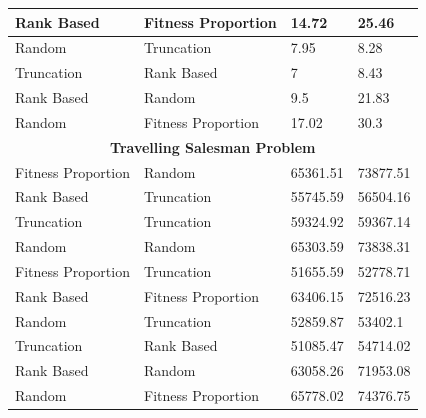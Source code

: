 \documentclass[11pt, letterpaper]{article}
\begin{document}
\begin{table}[ht]
\begin{tabular}{|l|l|l|l|}
        Rank Based & Fitness Proportion & 14.72 & 25.46 \\ \hline
        Random & Truncation & 7.95 & 8.28 \\ \hline
        Truncation & Rank Based & 7 & 8.43 \\ \hline
        Rank Based & Random & 9.5 & 21.83 \\ \hline
        Random & Fitness Proportion & 17.02 & 30.3 \\ \hline
        \multicolumn{4}{|c|}{\textbf{Travelling Salesman Problem}} \\ \hline
        Fitness Proportion & Random & 65361.51 & 73877.51 \\ \hline
        Rank Based & Truncation & 55745.59 & 56504.16 \\ \hline
        Truncation & Truncation & 59324.92 & 59367.14 \\ \hline
        Random & Random & 65303.59 & 73838.31 \\ \hline
        Fitness Proportion & Truncation & 51655.59 & 52778.71 \\ \hline
        Rank Based & Fitness Proportion & 63406.15 & 72516.23 \\ \hline
        Random & Truncation & 52859.87 & 53402.1 \\ \hline
        Truncation & Rank Based & 51085.47 & 54714.02 \\ \hline
        Rank Based & Random & 63058.26 & 71953.08 \\ \hline
        Random & Fitness Proportion & 65778.02 & 74376.75 \\ \hline
    \end{tabular}
\end{table}
\end{document}
